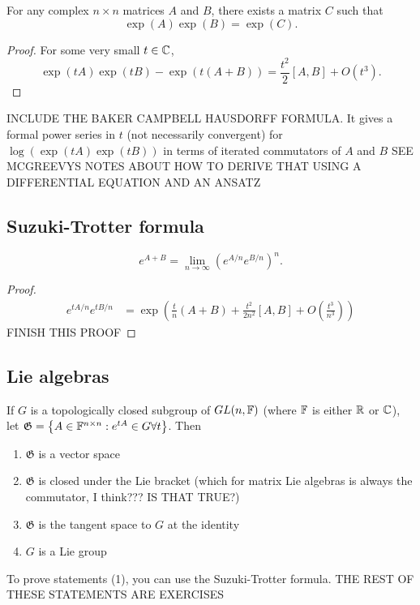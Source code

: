 \documentclass[class=article, crop=false]{standalone}
\begin{document}
\begin{prop}
    For any complex $n \times n$ matrices $A$ and $B$, there exists a matrix $C$ such that
    \[ \exp(A) \exp(B) = \exp(C). \]
\end{prop}
\begin{proof}
    For some very small $t \in \mathbb{C}$,
    \[ \exp(tA)\exp(tB)-\exp(t(A+B))= \frac{t^2}{2} [A,B]+O(t^3). \]
\end{proof}
INCLUDE THE BAKER CAMPBELL HAUSDORFF FORMULA. It gives a formal power series in $t$ (not necessarily convergent) for $\log(\exp(tA)\exp(tB))$ in terms of iterated commutators of $A$ and $B$
SEE MCGREEVYS NOTES ABOUT HOW TO DERIVE THAT USING A DIFFERENTIAL EQUATION AND AN ANSATZ
\subsection{Suzuki-Trotter formula}
\begin{thm}
    \[ e^{A+B}=\lim_{n \rightarrow \infty} \left( e^{A/n}e^{B/n} \right)^n. \]
\end{thm}
\begin{proof}
    \begin{align*}
        e^{tA/n}e^{tB/n}&=\exp \left( \frac{t}{n} (A+B)+ \frac{t^2}{2n^2} [A,B] + O\left( \frac{t^3}{n^3}\right) \right)
    \end{align*}
    FINISH THIS PROOF
\end{proof}
\subsection{Lie algebras}
If $G$ is a topologically closed subgroup of $GL(n,\mathbb{F})$ (where $\mathbb{F}$ is either $\mathbb{R}$ or $\mathbb{C}$), let $\mathfrak{G}= \left\{ A \in \mathbb{F}^{n \times n}: e^{tA} \in G \forall t \right\}$. Then
\begin{enumerate}
    \item $\mathfrak{G}$ is a vector space
    \item $\mathfrak{G}$ is closed under the Lie bracket (which for matrix Lie algebras is always the commutator, I think??? IS THAT TRUE?)
    \item $\mathfrak{G}$ is the tangent space to $G$ at the identity
    \item $G$ is a Lie group
\end{enumerate}
To prove statements (1), you can use the Suzuki-Trotter formula. THE REST OF THESE STATEMENTS ARE EXERCISES
\end{document}

